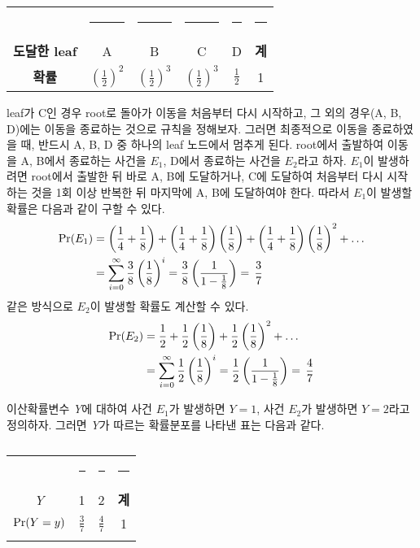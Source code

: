 \documentclass[11pt]{article}
\begin{document}
\begin{table}[h]
\centering
\begin{tabular}{cccccc}
\toprule
 & \rule{1cm}{0pt} & \rule{1cm}{0pt} & \rule{1cm}{0pt} & \rule{1cm}{0pt} & \rule{0.5cm}{0pt} \\[-\arraystretch\normalbaselineskip]
\textbf{도달한 leaf} & A & B & C & D & \textbf{계} \\
\midrule
\textbf{확률} & $\displaystyle \left(\frac{1}{2}\right)^2$ & $\displaystyle \left(\frac{1}{2}\right)^3$ & $\displaystyle \left(\frac{1}{2}\right)^3$ & $\displaystyle \frac{1}{2}$ & 1 \\
\bottomrule
\end{tabular}
\caption{}
\label{tab01}
\end{table}
 leaf가 C인 경우 root로 돌아가 이동을 처음부터 다시 시작하고, 그 외의 경우(A, B, D)에는 이동을 종료하는 것으로 규칙을 정해보자. 그러면 최종적으로 이동을 종료하였을 때, 반드시 A, B, D 중 하나의 leaf 노드에서 멈추게 된다. root에서 출발하여 이동을 A, B에서 종료하는 사건을 ${E}_{1}$, D에서 종료하는 사건을 ${E}_{2}$라고 하자. ${E}_{1}$이 발생하려면 root에서 출발한 뒤 바로 A, B에 도달하거나, C에 도달하여 처음부터 다시 시작하는 것을 1회 이상 반복한 뒤 마지막에 A, B에 도달하여야 한다. 따라서 ${E}_{1}$이 발생할 확률은 다음과 같이 구할 수 있다.
\[
\begin{split}
\textnormal{Pr}(E_{1}) & = \left(\frac{1}{4} + \frac{1}{8}\right)
+ \left(\frac{1}{4} + \frac{1}{8}\right)\left(\frac{1}{8}\right)
+ \left(\frac{1}{4} + \frac{1}{8}\right)\left(\frac{1}{8}\right)^2 + \ldots \\
& = \sum_{i=0}^{\infty} \frac{3}{8}\left(\frac{1}{8}\right)^i = \frac{3}{8}\left(\frac{1}{1 - \frac{1}{8}}\right) = \,\frac{3}{7}
\end{split}
\]
같은 방식으로 ${E}_{2}$이 발생할 확률도 계산할 수 있다.
\[
\begin{split}
\textnormal{Pr}(E_{2}) & = \frac{1}{2}
+ \frac{1}{2}\left(\frac{1}{8}\right)
+ \frac{1}{2}\left(\frac{1}{8}\right)^2 + \ldots \\
& = \sum_{i=0}^{\infty} \frac{1}{2}\left(\frac{1}{8}\right)^i = \frac{1}{2}\left(\frac{1}{1 - \frac{1}{8}}\right) = \,\frac{4}{7}
\end{split}
\]

이산확률변수 \textit{Y}에 대하여 사건 $E_{1}$가 발생하면 $Y=1$, 사건 $E_{2}$가 발생하면 $Y=2$라고 정의하자. 그러면 \textit{Y}가 따르는 확률분포를 나타낸 표는 다음과 같다.

\begin{table}[h]
\centering
\begin{tabular}{cccc}
\toprule
 & \rule{0.8cm}{0pt} & \rule{0.8cm}{0pt} & \rule{0.4cm}{0pt} \\[-\arraystretch\normalbaselineskip]
\textit{Y} & 1 & 2 & \textbf{계} \\
\midrule
$\textnormal{Pr}(Y=y)$ & $\displaystyle \frac{3}{7}$ & $\displaystyle \frac{4}{7}$ & 1 \\
\bottomrule
\caption{}
\label{tab02}
\end{tabular}
\end{table}
\end{document}
